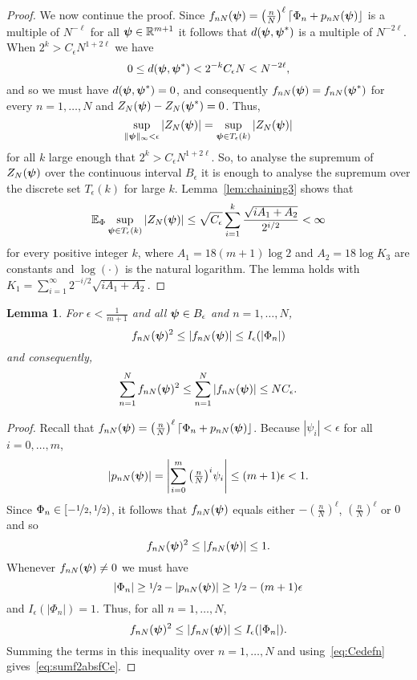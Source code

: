 \documentclass[aap]{imsart}
\newcommand{\reals}{{\mathbb R}}
\newcommand{\expect}{{\mathbb E}}
\newcommand{\abs}[1]{\left\vert #1 \right\vert}
\newcommand{\round}[1]{{\left\lceil #1 \right\rfloor}}
\newtheorem{lemma}{Lemma}
\begin{document}
\begin{proof}
We now continue the proof.  Since $f_{nN}(\psibf) = \left( \tfrac{n}{N}\right)^\ell \round{\Phi_n + p_{nN}(\psibf)}$ is a multiple of $N^{-\ell}$ for all $\psibf \in \reals^{m+1}$ it follows that $d(\boldsymbol{\psi}, \boldsymbol{\psi}^*)$ is a multiple of $N^{-2\ell}$.  When $2^k > C_\epsilon N^{1+2\ell}$ we have 
\[
0 \leq d(\boldsymbol{\psi}, \boldsymbol{\psi}^*) < 2^{-k} C_\epsilon N < N^{-2\ell},
\]
and so we must have $d(\boldsymbol{\psi}, \boldsymbol{\psi}^*) = 0$, and consequently $f_{nN}(\boldsymbol{\psi}) = f_{nN}(\boldsymbol{\psi}^*)$  for every $n = 1, \dots, N$ and $Z_N(\boldsymbol{\psi}) - Z_N(\boldsymbol{\psi}^*) = 0$.  Thus,
\[
\sup_{\|\psibf\|_{\infty} < \epsilon } \abs{ Z_N(\psibf) } = \sup_{\psibf \in T_\epsilon(k) } \abs{ Z_N(\psibf) }
\]
for all $k$ large enough that $2^{k} > C_\epsilon N^{1+2\ell}$.  So, to analyse the supremum of $Z_N(\boldsymbol{\psi})$ over the continuous interval $B_\epsilon$ it is enough to analyse the supremum over the discrete set $T_\epsilon(k)$ for large $k$.  Lemma~\ref{lem:chaining3} shows that 
\[
\expect_{\Phi} \sup_{\psibf \in T_\epsilon(k) } \abs{ Z_N(\psibf) } \leq \sqrt{C_\epsilon} \sum_{i=1}^{k}\frac{\sqrt{ i A_1 + A_2}}{2^{i/2}} < \infty
\]
for every positive integer $k$, where $A_1 = 18(m+1)\log 2$ and $A_2 = 18\log K_3$ are constants and $\log(\cdot)$ is the natural logarithm.  The lemma holds with $K_1 =  \sum_{i=1}^{\infty}2^{-i/2}\sqrt{ i A_1 + A_2 }$.
\end{proof}

\begin{lemma}\label{lem:epslmlemma}
For $\epsilon < \frac{1}{m+1}$ and all $\boldsymbol{\psi} \in B_\epsilon$ and $n = 1, \dots, N$,
\[
f_{nN}(\psibf)^2 \leq \abs{f_{nN}(\psibf)} \leq I_\epsilon(\abs{\Phi_n})
\]
and consequently,
\begin{equation}\label{eq:sumf2absfCe}
\sum_{n=1}^{N}f_{nN}(\psibf)^2 \leq \sum_{n=1}^{N}\abs{f_{nN}(\psibf)} \leq N C_\epsilon.
\end{equation}
\end{lemma}
\begin{proof}
Recall that $f_{nN}(\psibf) = \left( \tfrac{n}{N}\right)^\ell \round{\Phi_n + p_{nN}(\psibf)}$.  Because $\abs{\psi_i} < \epsilon$ for all $i = 0, \dots, m$, 
\begin{equation}\label{eq:pnNsmall}
\abs{p_{nN}(\psibf)} = \abs{\sum_{i=0}^{m}\big(\tfrac{n}{N}\big)^i \psi_i} \leq (m+1)\epsilon < 1.
\end{equation}
Since $\Phi_n \in [-\nicefrac{1}{2}, \nicefrac{1}{2})$, it follows that $f_{nN}(\boldsymbol{\psi})$ equals either $-(\tfrac{n}{N})^\ell$, $(\tfrac{n}{N})^\ell$ or $0$ and so
\begin{equation}\label{eq:fnNleqfnNs}
   f_{nN}(\psibf)^2 \leq \abs{f_{nN}(\psibf)} \leq 1.
\end{equation}
Whenever $f_{nN}(\boldsymbol{\psi}) \neq 0$ we must have 
\[
\abs{\Phi_n} \geq \nicefrac{1}{2} - \abs{p_{nN}(\psibf)} \geq \nicefrac{1}{2} - (m+1)\epsilon
\]
and $I_\epsilon(\abs{\Phi_n}) = 1$.  Thus, for all $n = 1, \dots, N$,
\[
f_{nN}(\psibf)^2 \leq \abs{f_{nN}(\psibf)} \leq I_\epsilon(\abs{\Phi_n}). %
\]
Summing the terms in this inequality over $n = 1, \dots, N$ and using~\eqref{eq:Cedefn} gives~\eqref{eq:sumf2absfCe}.
\end{proof}
\end{document}

